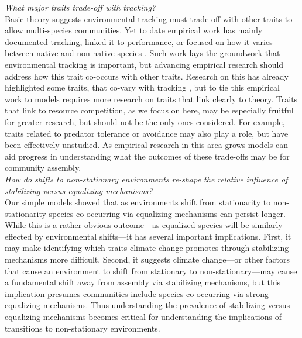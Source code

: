 \documentclass[11pt,letterpaper]{article}
\begin{document}
\emph{What major traits trade-off with tracking?} \\

Basic theory suggests environmental tracking must trade-off with other traits to allow multi-species communities. Yet to date empirical work has mainly documented tracking, linked it to performance, or focused on how it varies between native and non-native species \citep{Willis:2010al,wolkovichAmBot2013,Zettlemoyer2019}. Such work lays the groundwork that environmental tracking is important, but advancing empirical research should address how this trait co-occurs with other traits. Research on this has already highlighted some traits, that co-vary with tracking \citep[e.g.,][]{kharouba2014,lasky2016,Zhu2016BioLetters}, but to tie this empirical work to models requires more research on traits that link clearly to theory. Traits that link to resource competition, as we focus on here, may be especially fruitful for greater research, but should not be the only ones considered. For example, traits related to predator tolerance or avoidance may also play a role, but have been effectively unstudied.  As empirical research in this area grows models can aid progress in understanding what the outcomes of these trade-offs may be for community assembly.\\ 

\emph{How do shifts to non-stationary environments re-shape the relative influence of stabilizing versus equalizing mechanisms?} \\

Our simple models showed that as environments shift from stationarity to non-stationarity species co-occurring via equalizing mechanisms can persist longer. While this is a rather obvious outcome---as equalized species will be similarly effected by environmental shifts---it has several important implications. First, it may make identifying which traits climate change promotes through stabilizing mechanisms more difficult. Second, it suggests climate change---or other factors that cause an environment to shift from stationary to non-stationary---may cause a fundamental shift away from assembly via stabilizing mechanisms, but this implication presumes communities include species co-occurring via strong equalizing mechanisms. Thus understanding the prevalence of stabilizing versus equalizing mechanisms \citep[which ecology has worked on for many decades,][]{Caswell:1976np,Gravel:2006ax,Chesson:2000vd} becomes critical for understanding the implications of transitions to non-stationary environments. 
\end{document}
